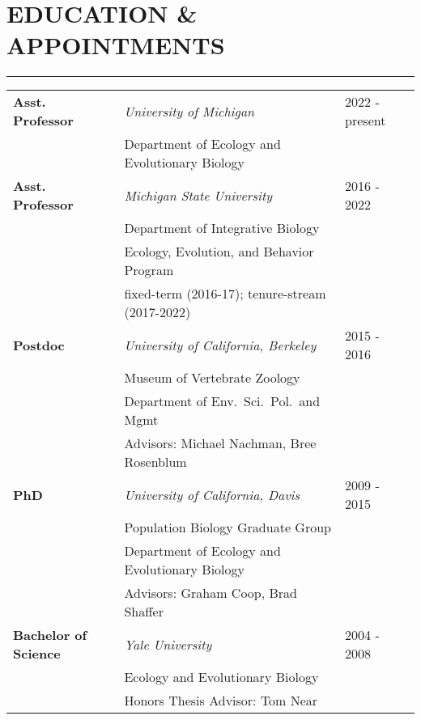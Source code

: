 \documentclass{article}
\begin{document}
\section*{EDUCATION \& APPOINTMENTS}
\vspace{-0.6cm}
\rule{470pt}{0.4pt}
%
\begin{tabular}{p{} p{} p{}} 
\\
\bf{Asst. Professor} & \it{University of Michigan} & \hfill 2022 - present\\
 & \hspace{0.5cm}Department of Ecology and Evolutionary Biology & \\
%
\bf{Asst. Professor} & \it{Michigan State University} & \hfill 2016 - 2022\\
 & \hspace{0.5cm}Department of Integrative Biology & \\
 & \hspace{0.5cm}Ecology, Evolution, and Behavior Program& \\
  & \hspace{0.5cm}fixed-term (2016-17); tenure-stream (2017-2022)& \\
%
%
%
%
\bf{Postdoc} & \it{University of California, Berkeley} & \hfill 2015 - 2016\\
 & \hspace{0.5cm}Museum of Vertebrate Zoology & \\
 & \hspace{0.5cm}Department of Env.\ Sci.\ Pol.\ and Mgmt& \\
 & \hspace{0.5cm}Advisors: Michael Nachman, Bree Rosenblum & \\ 
%
%
\bf{PhD} & \it{University of California, Davis}  & \hfill 2009 - 2015\\
 & \hspace{0.5cm}Population Biology Graduate Group & \\
 & \hspace{0.5cm}Department of Ecology and Evolutionary Biology & \\
 & \hspace{0.5cm}Advisors: Graham Coop, Brad Shaffer & \\ 
%
%
\textbf{Bachelor of Science} & \it{Yale University} & \hfill 2004 - 2008 \\
& \hspace{0.5cm}Ecology and Evolutionary Biology & \\
& \hspace{0.5cm}Honors Thesis Advisor: Tom Near & \\
\end{tabular}
%
%
\end{document}
